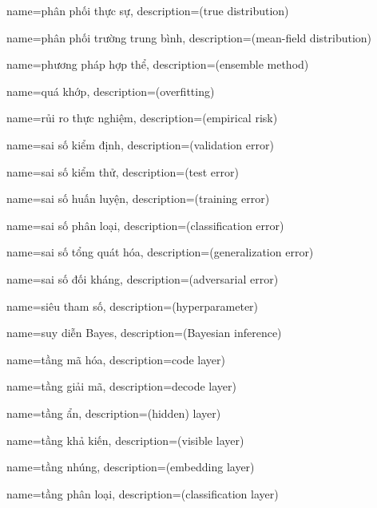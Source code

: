 {
    name={phân phối thực sự},
    description={(true distribution)}
}

{
    name={phân phối trường trung bình},
    description={(mean-field distribution)}
}

{
    name={phương pháp hợp thể},
    description={(ensemble method)}
}

{
    name={quá khớp},
    description={(overfitting)}
}

{
    name={rủi ro thực nghiệm},
    description={(empirical risk)}
}

{
    name={sai số kiểm định},
    description={(validation error)}
}

{
    name={sai số kiểm thử},
    description={(test error)}
}

{
    name={sai số huấn luyện},
    description={(training error)}
}

{
    name={sai số phân loại},
    description={(classification error)}
}

{
    name={sai số tổng quát hóa},
    description={(generalization error)}
}

{
    name={sai số đối kháng},
    description={(adversarial error)}
}

{
    name={siêu tham số},
    description={(hyperparameter)}
}

{
    name={suy diễn Bayes},
    description={(Bayesian inference)}
}

{
    name={tầng mã hóa},
    description={code layer)}
}

{
    name={tầng giải mã},
    description={decode layer)}
}

{
    name={tầng ẩn},
    description={(hidden) layer)}
}

{
    name={tầng khả kiến},
    description={(visible layer)}
}

{
    name={tầng nhúng},
    description={(embedding layer)}
}

{
    name={tầng phân loại},
    description={(classification layer)}
}

